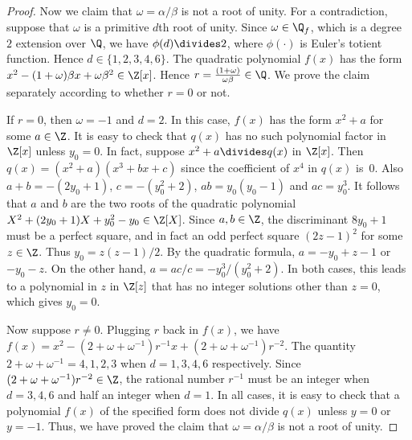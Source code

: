 \documentclass[11pt]{article}
\begin{document}
\begin{proof}
 Now we claim that $\omega = \alpha / \beta$ is not a root of unity.
 For a contradiction,
 suppose that $\omega$ is a primitive $d$th root of unity.
 Since $\omega \in \Q_f$,
 which is a degree~$2$ extension over $\Q$,
 we have $\phi(d) \divides 2$,
 where $\phi(\cdot)$ is Euler's totient function.
 Hence $d \in \{1,2,3,4,6\}$.
 The quadratic polynomial $f(x)$ has the form $x^2 - (1 + \omega) \beta x + \omega \beta^2 \in \Z[x]$.
 Hence $r = \frac{(1 + \omega)}{\omega \beta} \in \Q$.
 We prove the claim separately according to whether $r=0$ or not.

 If $r = 0$,
 then  $\omega = -1$ and $d = 2$.
 In this case,
 $f(x)$ has the form $x^2 + a$ for some $a \in \Z$.
 It is easy to check that $q(x)$ has no such polynomial factor in $\Z[x]$ unless $y_0 = 0$.
 In fact,
 suppose $x^2 + a \divides q(x)$ in $\Z[x]$.
 Then $q(x) = (x^2 + a)(x^3 + bx + c)$ since the coefficient of $x^4$ in $q(x)$ is~$0$.
 Also $a + b = -(2 y_0 + 1)$,
 $c= -(y_0^2 +2)$,
 $a b = y_0 (y_0 - 1)$ and $a c = y_0^3$.
 It follows that $a$ and $b$ are the two roots of the quadratic polynomial $X^2 + (2 y_0 + 1) X + y_0^2 - y_0 \in \Z[X]$.
 Since $a, b \in \Z$, 
 the discriminant $8 y_0 + 1$ must be a perfect square,
 and in fact an odd perfect square $(2 z - 1)^2$ for some $z \in \Z$.
 Thus $y_0 = z (z - 1) / 2$.
 By the quadratic formula,
 $a = -y_0 + z -1$ or $-y_0 - z$.
 On the other hand,
 $a = a c / c = -y_0^3 / (y_0^2 + 2)$.
 In both cases,
 this leads to a polynomial in $z$ in $\Z[z]$ that has no integer solutions other than $z = 0$,
 which gives $y_0 = 0$.

 Now suppose $r \neq 0$.
 Plugging $r$ back in $f(x)$,
 we have $f(x) = x^2 - (2 + \omega + \omega^{-1}) r^{-1} x + (2 + \omega + \omega^{-1}) r^{-2}$.
 The quantity $2 + \omega + \omega^{-1} = 4,1,2,3$ when $d = 1,3,4,6$ respectively.
 Since $(2 + \omega + \omega^{-1}) r^{-2} \in \Z$,
 the rational number $r^{-1}$ must be an integer when $d = 3,4,6$ and half an integer when $d = 1$.
 In all cases,
 it is easy to check that a polynomial $f(x)$ of the specified form does not divide $q(x)$ unless $y = 0$ or $y = -1$.
 Thus, we have proved the claim that $\omega = \alpha / \beta$ is not a root of unity.





\end{proof}
\end{document}
